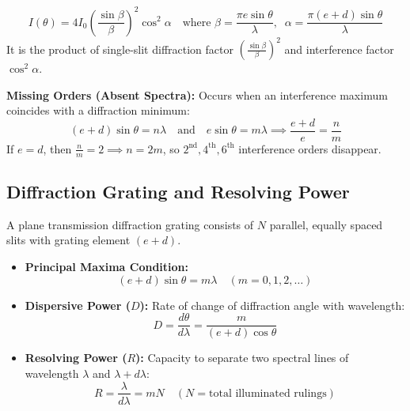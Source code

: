 \documentclass[12pt,a4paper]{article}
\begin{document}
\begin{tcolorbox}[formulabox, title={\textbf{Double Slit Intensity Formula}}]
\begin{equation}
I(\theta) = 4 I_0 \left(\frac{\sin \beta}{\beta}\right)^2 \cos^2 \alpha \quad \text{where } \beta = \frac{\pi e \sin \theta}{\lambda}, \;\; \alpha = \frac{\pi (e+d) \sin \theta}{\lambda}
\end{equation}
It is the product of single-slit diffraction factor $\left(\frac{\sin\beta}{\beta}\right)^2$ and interference factor $\cos^2\alpha$.
\end{tcolorbox}

\textbf{Missing Orders (Absent Spectra):} Occurs when an interference maximum coincides with a diffraction minimum:
\begin{equation}
(e+d)\sin\theta = n \lambda \quad \text{and} \quad e\sin\theta = m \lambda \implies \frac{e+d}{e} = \frac{n}{m}
\end{equation}
If $e = d$, then $\frac{n}{m} = 2 \implies n = 2m$, so $2^{\text{nd}}, 4^{\text{th}}, 6^{\text{th}}$ interference orders disappear.

\subsection{Diffraction Grating and Resolving Power}

A plane transmission diffraction grating consists of $N$ parallel, equally spaced slits with grating element $(e+d)$.

\begin{tcolorbox}[formulabox, title={\textbf{Grating Equations and Resolving Power}}]
\begin{itemize}[leftmargin=*, itemsep=3pt]
  \item \textbf{Principal Maxima Condition:}
  \begin{equation}
  (e+d)\sin\theta = m \lambda \quad (m = 0, 1, 2, \ldots)
  \end{equation}
  \item \textbf{Dispersive Power ($D$):} Rate of change of diffraction angle with wavelength:
  \begin{equation}
  D = \frac{d\theta}{d\lambda} = \frac{m}{(e+d)\cos\theta}
  \end{equation}
  \item \textbf{Resolving Power ($R$):} Capacity to separate two spectral lines of wavelength $\lambda$ and $\lambda + d\lambda$:
  \begin{equation}
  R = \frac{\lambda}{d\lambda} = m N \quad (N = \text{total illuminated rulings})
  \end{equation}
\end{itemize}
\end{tcolorbox}
\end{document}
